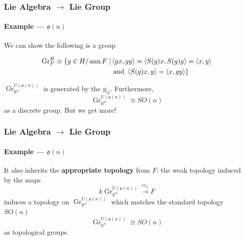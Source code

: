 \documentclass{beamer}
\begin{document}
\begin{frame}

\frametitle{Lie Algebra $\to$ Lie Group}

\framesubtitle{Example ---  $\mathfrak{o}(n)$}



 We can show the following is a group

\begin{equation*}
\begin{split}
\operatorname{Gr}_F^H \equiv \{ g \in H/\operatorname{ann} F \mid &\left\langle g x, gy \right\rangle = \left\langle S(g) x, S(g) y \right\rangle = \left\langle x,y \right\rangle \\
&\text{ and } \left\langle S(g) x, y \right\rangle = \left\langle x, gy \right\rangle \}
\end{split}
\end{equation*}

\medskip

$\operatorname{Gr}^{U(\mathfrak{o}(n))}_{\mathbb{R}^n}$ is generated by the $g_{ij}$. Furthermore,
\begin{equation*}
\operatorname{Gr}^{U(\mathfrak{o}(n))}_{\mathbb{R}^n} \cong SO(n)
\end{equation*}
as a discrete group. But we get more!

\end{frame}





\begin{frame}

\frametitle{Lie Algebra $\to$ Lie Group}

\framesubtitle{Example ---  $\mathfrak{o}(n)$}






 It also inherits the \textbf{appropriate topology} from $F$: the weak topology induced by the maps
\begin{equation*}
k \operatorname{Gr}^{U(\mathfrak{o}(n))}_{\mathbb{R}^n} \xrightarrow{ev_x} F
\end{equation*}
induces a topology on $\operatorname{Gr}^{U(\mathfrak{o}(n))}_{\mathbb{R}^n}$ which matches the standard topology $SO(n)$
\begin{equation*}
\operatorname{Gr}^{U(\mathfrak{o}(n))}_{\mathbb{R}^n} \cong SO(n)
\end{equation*}
as topological groups.

\end{frame}
\end{document}
